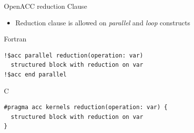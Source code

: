 \documentclass[10pt,t]{beamer}
\begin{document}
\begin{frame}{OpenACC reduction Clause}
  \begin{itemize}
    \item Reduction clause is allowed on \textit{parallel} and \textit{loop} constructs
  \end{itemize}
  \begin{exampleblock}{Fortran}
    \begin{lstlisting}[basicstyle=\tiny\ttfamily,language=OmpFortran]
!$acc parallel reduction(operation: var)
  structured block with reduction on var
!$acc end parallel
    \end{lstlisting}
  \end{exampleblock}
  \begin{exampleblock}{C}
    \begin{lstlisting}[basicstyle=\tiny\ttfamily,language=OmpC]
#pragma acc kernels reduction(operation: var) {
  structured block with reduction on var
}
    \end{lstlisting}
  \end{exampleblock}

\end{frame}
\end{document}
